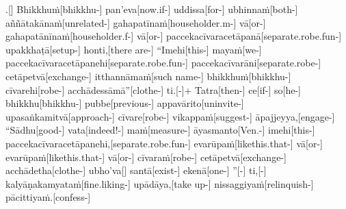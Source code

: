 \documentclass[12pt]{article}
\newcommand{\EnglishColumn}[1]{\itshape\footnotesize{#1}}
\begin{document}
\begin{paracol}{2}
\begin{column}
\switchcolumn


\begin{flushleft}
.[] Bhikkhuṁ[bhikkhu-] pan’eva[now.if-] uddissa[for-] ubhinnaṁ[both-] aññātakānaṁ[unrelated-] gahapatīnaṁ[householder.m-] vā[or-] gahapatānīnaṁ[householder.f-] vā[or-] paccekacīvaracetāpanā[separate.robe.fun-] upakkhaṭā[setup-] honti,[there are-] “Imehi[this-] mayaṁ[we-] paccekacīvaracetāpanehi[separate.robe.fun-] paccekacīvarāni[separate.robe-] cetāpetvā[exchange-] itthannāmaṁ[such name-] bhikkhuṁ[bhikkhu-] cīvarehi[robe-] acchādessāmā”[clothe-] ti.[-\NUL{\GMU{}}]+ Tatra[then-] ce[if-\NUL{\GMU{}}] so[he-] bhikkhu[bhikkhu-] pubbe[previous-] appavārito[uninvite-] upasaṅkamitvā[approach-] cīvare[robe-] vikappaṁ[suggest-] āpajjeyya,[engage-] “Sādhu[good-] vata[indeed!-] maṁ[measure-] āyasmanto[Ven.-] imehi[this-] paccekacīvaracetāpanehi,[separate.robe.fun-] evarūpaṁ[likethis.that-] vā[or-] evarūpaṁ[likethis.that-] vā[or-] cīvaraṁ[robe-] cetāpetvā[exchange-] acchādetha[clothe-] ubho’va[] santā[exist-] ekenā[one-] ”[-\NUL{\GMU{}}] ti,[-\NUL{\GMU{}}] kalyāṇakamyataṁ[fine.liking-] upādāya,[take up-] nissaggiyaṁ[relinquish-] pācittiyaṁ.[confess-]
\endgl
\switchcolumn*
\end{flushleft}


{\EnglishColumn

}
\end{column}
\end{paracol}
\end{document}
